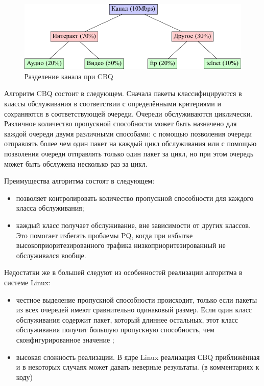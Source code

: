         \begin{figure}[ht!]
			\center
            \includegraphics[scale=1.2]{./pdfimages/cbq.pdf}
            \caption{Разделение канала при CBQ}
			\label{cbq}
        \end{figure}

        Алгоритм CBQ состоит в следующем. Сначала пакеты классифицируются в классы
        обслуживания в соответствии с определёнными критериями и сохраняются в
        соответствующей очереди. Очереди обслуживаются циклически. Различное
        количество пропускной способности может быть назначено для каждой очереди
        двумя различными способами: с помощью позволения очереди отправлять более
        чем один пакет на каждый цикл обслуживания или с помощью позволения очереди
        отправлять только один пакет за цикл, но при этом очередь может быть обслужена
        несколько раз за цикл.\cite{packethandling}

        Преимущества алгоритма состоят в следующем:
        \begin{itemize}
            \item позволяет контролировать количество пропускной способности для каждого
                  класса обслуживания;
            \item каждый класс получает обслуживание, вне зависимости от других классов. Это
                  помогает избегать проблемы PQ, когда при избытке высокоприоритезированного
                  трафика низкоприоритезированный не обслуживался вообще.\cite{packethandling}
        \end{itemize}

        Недостатки же в большей следуют из особенностей реализации алгоритма в системе Linux:
        \begin{itemize}
            \item честное выделение пропускной способности происходит, только если
                  пакеты из всех очередей имеют сравнительно одинаковый размер. Если один класс
                  обслуживания содержит пакет, который длиннее остальных, этот класс обслуживания
                  получит большую пропускную способность, чем сконфигурированное значение \cite{packethandling};

            \item высокая сложность реализации. В ядре Linux реализация СBQ приближённая и
                  в некоторых случаях может давать неверные результаты. (в комментариях к коду)
        \end{itemize}

